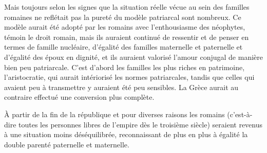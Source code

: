 Mais toujours selon  les signes que la situation réelle vécue
au sein des familles romaines ne reflétait pas la pureté du modèle patriarcal
sont nombreux. Ce modèle aurait été adopté par les romains avec
l'enthousiasme des néophytes, témoin le droit romain, mais ils auraient
continué de ressentir et de penser en termes de famille nucléaire,
d'égalité des familles maternelle et paternelle et d'égalité des époux en dignité,
et ils auraient valorisé l'amour conjugal de manière bien peu patriarcale.
C'est d'abord les familles les plus riches en patrimoine,
l'aristocratie, qui aurait intériorisé les normes patriarcales, tandis que celles
qui avaient peu à transmettre y auraient été peu sensibles. La Grèce
aurait au contraire effectué une conversion plus complète.

À partir de la fin de la république et pour diverses raisons les romains
(c'est-à-dire toutes les personnes libres de l'empire dès le troisième
siècle) seraient revenus à une situation moins déséquilibrée, reconnaissant
de plus en plus à égalité la double parenté paternelle et maternelle.

